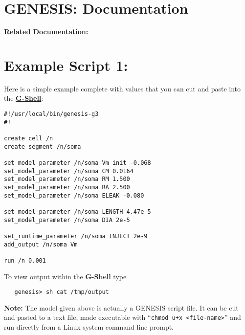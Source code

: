\documentclass[12pt]{article}
\begin{document}
\section*{GENESIS: Documentation}

{\bf Related Documentation:}

\section*{Example Script 1:}

Here is a simple example complete with values that you can cut and paste into the \href{../gshell/gshell.tex}{\bf G-Shell}:

\begin{verbatim}
#!/usr/local/bin/genesis-g3
#!

create cell /n
create segment /n/soma

set_model_parameter /n/soma Vm_init -0.068
set_model_parameter /n/soma CM 0.0164
set_model_parameter /n/soma RM 1.500
set_model_parameter /n/soma RA 2.500
set_model_parameter /n/soma ELEAK -0.080

set_model_parameter /n/soma LENGTH 4.47e-5
set_model_parameter /n/soma DIA 2e-5

set_runtime_parameter /n/soma INJECT 2e-9
add_output /n/soma Vm

run /n 0.001
\end{verbatim}
To view output within the {\bf G-Shell} type
\begin{verbatim}
   genesis> sh cat /tmp/output
\end{verbatim}
{\bf Note:} The model given above is actually a GENESIS script file. It can be cut and pasted to a text file, made executable with ``{\tt chmod u+x <file-name>}'' and run directly from a Linux system command line prompt.
\end{document}
